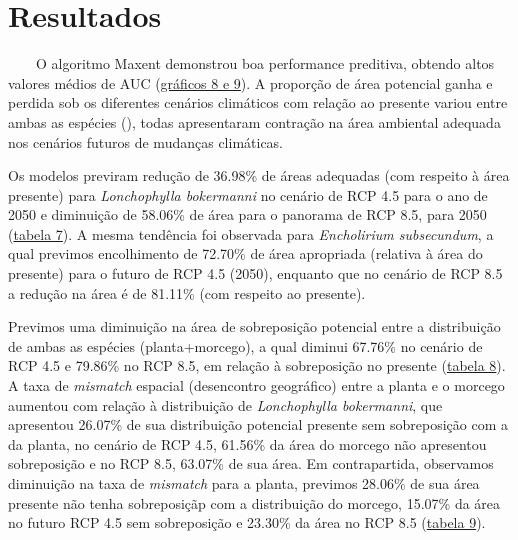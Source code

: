 \documentclass[
  11pt,
]{article}
\author{}
\date{\vspace{-2.5em}}
\begin{document}
\clearpage

\hypertarget{resultados}{%
\section{Resultados}\label{resultados}}

~~~~O algoritmo Maxent demonstrou boa performance preditiva, obtendo
altos valores médios de AUC (\protect\hyperlink{apuxeandice}{gráficos 8
e 9}). A proporção de área potencial ganha e perdida sob os diferentes
cenários climáticos com relação ao presente variou entre ambas as
espécies (\label{tabela6}), todas apresentaram contração na área
ambiental adequada nos cenários futuros de mudanças climáticas.

Os modelos previram redução de 36.98\% de áreas adequadas (com respeito
à área presente) para \emph{Lonchophylla bokermanni} no cenário de RCP
4.5 para o ano de 2050 e diminuição de 58.06\% de área para o panorama
de RCP 8.5, para 2050 (\protect\hyperlink{apuxeandice}{tabela 7}). A
mesma tendência foi observada para \emph{Encholirium subsecundum}, a
qual previmos encolhimento de 72.70\% de área apropriada (relativa à
área do presente) para o futuro de RCP 4.5 (2050), enquanto que no
cenário de RCP 8.5 a redução na área é de 81.11\% (com respeito ao
presente).

Previmos uma diminuição na área de sobreposição potencial entre a
distribuição de ambas as espécies (planta+morcego), a qual diminui
67.76\% no cenário de RCP 4.5 e 79.86\% no RCP 8.5, em relação à
sobreposição no presente (\protect\hyperlink{apuxeandice}{tabela 8}). A
taxa de \emph{mismatch} espacial (desencontro geográfico) entre a planta
e o morcego aumentou com relação à distribuição de \emph{Lonchophylla
bokermanni}, que apresentou 26.07\% de sua distribuição potencial
presente sem sobreposição com a da planta, no cenário de RCP 4.5,
61.56\% da área do morcego não apresentou sobreposição e no RCP 8.5,
63.07\% de sua área. Em contrapartida, observamos diminuição na taxa de
\emph{mismatch} para a planta, previmos 28.06\% de sua área presente não
tenha sobreposiçãp com a distribuição do morcego, 15.07\% da área no
futuro RCP 4.5 sem sobreposição e 23.30\% da área no RCP 8.5
(\protect\hyperlink{apuxeandice}{tabela 9}).
\end{document}
